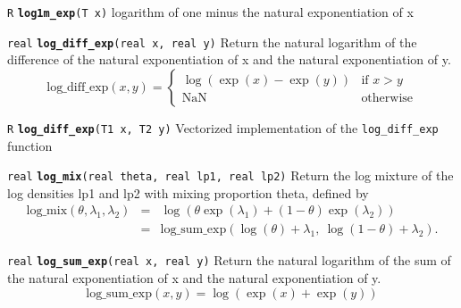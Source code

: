 \documentclass[
  10pt,
]{book}
\begin{document}

\texttt{R} \textbf{\texttt{log1m\_exp}}\texttt{(T\ x)}\newline
logarithm of one minus the natural exponentiation of x


\texttt{real} \textbf{\texttt{log\_diff\_exp}}\texttt{(real\ x,\ real\ y)}\newline
Return the natural logarithm of the difference of the natural
exponentiation of x and the natural exponentiation of y. \[
\mathrm{log\_diff\_exp}(x,y) = \begin{cases} \log(\exp(x)-\exp(y)) &
\text{if } x > y \\[6pt] \textrm{NaN} & \text{otherwise} \end{cases}
\]


\texttt{R} \textbf{\texttt{log\_diff\_exp}}\texttt{(T1\ x,\ T2\ y)}\newline
Vectorized implementation of the \texttt{log\_diff\_exp} function


\texttt{real} \textbf{\texttt{log\_mix}}\texttt{(real\ theta,\ real\ lp1,\ real\ lp2)}\newline
Return the log mixture of the log densities lp1 and lp2 with mixing
proportion theta, defined by \begin{eqnarray*}
\mathrm{log\_mix}(\theta, \lambda_1, \lambda_2) & = & \log \!\left(
\theta \exp(\lambda_1) + \left( 1 - \theta \right) \exp(\lambda_2)
\right) \\[3pt] & = & \mathrm{log\_sum\_exp}\!\left(\log(\theta) +
\lambda_1, \ \log(1 - \theta) + \lambda_2\right). \end{eqnarray*}


\texttt{real} \textbf{\texttt{log\_sum\_exp}}\texttt{(real\ x,\ real\ y)}\newline
Return the natural logarithm of the sum of the natural exponentiation
of x and the natural exponentiation of y. \[
\mathrm{log\_sum\_exp}(x,y) = \log(\exp(x)+\exp(y)) \]

\end{document}
